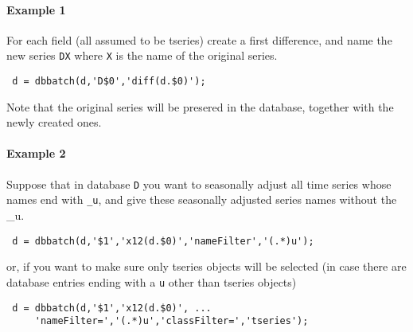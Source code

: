  \paragraph{Example 1}
 
 For each field (all assumed to be tseries) create a first difference,
 and name the new series \texttt{DX} where \texttt{X} is the name of the
 original series.
 
 \begin{verbatim}
 d = dbbatch(d,'D$0','diff(d.$0)');
 \end{verbatim}
 
 Note that the original series will be presered in the database, together
 with the newly created ones.
 
 \paragraph{Example 2}
 
 Suppose that in database \texttt{D} you want to seasonally adjust all
 time series whose names end with \texttt{\_u}, and give these seasonally
 adjusted series names without the \_u.
 
 \begin{verbatim}
 d = dbbatch(d,'$1','x12(d.$0)','nameFilter','(.*)u');
 \end{verbatim}
 
 or, if you want to make sure only tseries objects will be selected (in
 case there are database entries ending with a \texttt{u} other than
 tseries objects)
 
 \begin{verbatim}
 d = dbbatch(d,'$1','x12(d.$0)', ...
     'nameFilter=','(.*)u','classFilter=','tseries');
 \end{verbatim}


